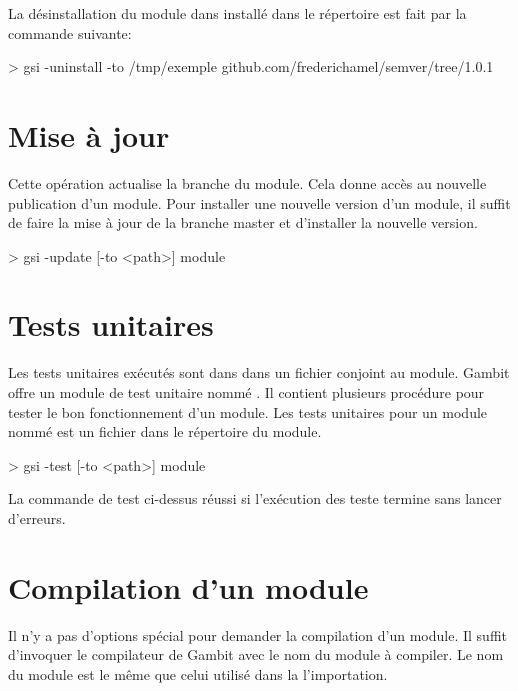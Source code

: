 La désinstallation du module  dans installé dans le
répertoire  est fait par la commande suivante:
\begin{center}
  \begin{mplisting}{1}
> gsi -uninstall -to /tmp/exemple github.com/frederichamel/semver/tree/1.0.1
\end{mplisting}
\end{center}


\section{Mise à jour}
Cette opération actualise la branche  du module.
Cela donne accès au nouvelle publication d'un module. Pour installer
une nouvelle version d'un module, il suffit de faire la mise à jour
de la branche master et d'installer la nouvelle version.

\begin{center}
  \begin{mplisting}{0.8}
> gsi -update [-to <path>] module
\end{mplisting}
\end{center}

\section{Tests unitaires}
Les tests unitaires exécutés sont dans dans un fichier conjoint au module.
Gambit offre un module de test unitaire nommé . Il
contient plusieurs procédure pour tester le bon fonctionnement d'un module.
Les tests unitaires pour un module nommé  est un fichier
 dans le répertoire du module.

\begin{center}
  \begin{mplisting}{0.8}
> gsi -test [-to <path>] module
\end{mplisting}
\end{center}

La commande de test ci-dessus réussi si l'exécution des teste termine sans
lancer d'erreurs.


\section{Compilation d'un module}
Il n'y a pas d'options spécial pour demander la compilation d'un module.
Il suffit d'invoquer le compilateur de Gambit avec le nom du module
à compiler. Le nom du module est le même que celui utilisé dans la
l'importation.




